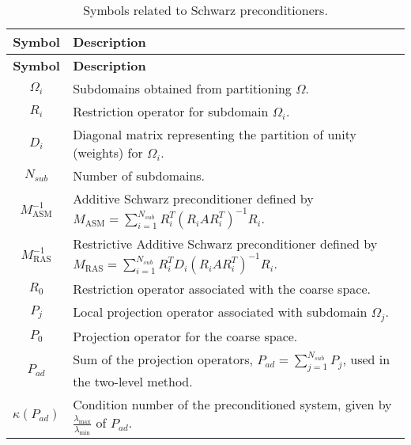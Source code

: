 \begin{longtable}{c p{10cm}}
    \caption{Symbols related to Schwarz preconditioners.}\label{tab:schwarz_symbols}                                                                         \\
    \hline
    \textbf{Symbol}       & \textbf{Description}                                                                                                             \\
    \hline
    \endfirsthead

    \hline
    \textbf{Symbol}       & \textbf{Description}                                                                                                             \\
    \hline
    \endhead

    \hline
    \endfoot

    \hline
    \endlastfoot

    $\Omega_i$            & Subdomains obtained from partitioning $\Omega$.                                                                                  \\
    $R_i$                 & Restriction operator for subdomain $\Omega_i$.                                                                                   \\
    $D_i$                 & Diagonal matrix representing the partition of unity (weights) for $\Omega_i$.                                                    \\
    $N_{sub}$             & Number of subdomains.                                                                                                            \\
    $M^{-1}_{\text{ASM}}$ & Additive Schwarz preconditioner defined by $M_{\text{ASM}} = \sum_{i=1}^{N_{sub}} R_i^T (R_i A R_i^T)^{-1} R_i$.                 \\
    $M^{-1}_{\text{RAS}}$ & Restrictive Additive Schwarz preconditioner defined by $M_{\text{RAS}} = \sum_{i=1}^{N_{sub}} R_i^T D_i (R_i A R_i^T)^{-1} R_i$. \\
    $R_0$                 & Restriction operator associated with the coarse space.                                                                           \\
    $P_j$                 & Local projection operator associated with subdomain $\Omega_j$.                                                                  \\
    $P_0$                 & Projection operator for the coarse space.                                                                                        \\
    $P_{ad}$              & Sum of the projection operators, $P_{ad} = \sum_{j=1}^{N_{sub}} P_j$, used in the two-level method.                              \\
    $\kappa(P_{ad})$      & Condition number of the preconditioned system, given by $\frac{\lambda_{\max}}{\lambda_{\min}}$ of $P_{ad}$.                     \\
\end{longtable}

